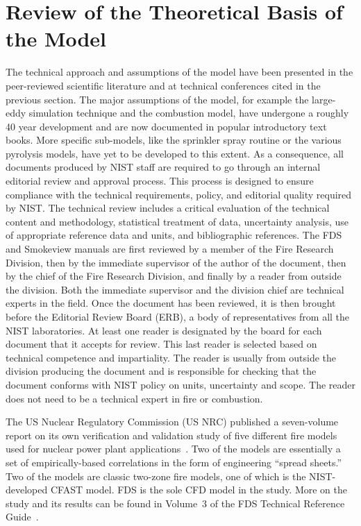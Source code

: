 \documentclass[11pt]{book}
\begin{document}
\section{Review of the Theoretical Basis of the Model}
\label{JustAA}

The technical approach and assumptions of the model have been presented in the peer-reviewed scientific literature and at technical conferences cited in the previous section. The major assumptions of the model, for example the large-eddy simulation technique and the combustion model, have undergone a roughly 40 year development and are now documented in popular introductory text books. More specific sub-models, like the sprinkler spray routine or the various pyrolysis models, have yet to be developed to this extent. As a consequence, all documents produced by NIST staff are required to go through an internal editorial review and approval process. This process is designed to ensure compliance with the technical requirements, policy, and editorial quality required by NIST. The technical review includes a critical evaluation of the technical content and methodology, statistical treatment of data, uncertainty analysis, use of appropriate reference data and units, and bibliographic references. The FDS and Smokeview manuals are first reviewed by a member of the Fire Research Division, then by the immediate supervisor of the author of the document, then by the chief of the Fire Research Division, and finally by a reader from outside the division. Both the immediate supervisor and the division
chief are technical experts in the field. Once the document has been reviewed, it is then brought before the Editorial Review Board (ERB), a body of representatives from all the NIST laboratories. At least one reader is designated by the board for each document that it accepts for review. This last reader is selected based on technical competence and impartiality. The reader is usually from outside the division producing the document and is responsible for checking that the document conforms with NIST policy on units, uncertainty and scope. The reader does not need to be a technical expert in fire or combustion.

The US Nuclear Regulatory Commission (US NRC) published a seven-volume report on its own verification and validation study of five different fire models used for nuclear power plant applications~\cite{NUREG_1824_Sup_1}. Two of the models are essentially a set of empirically-based correlations in the form of engineering ``spread sheets.'' Two of the models are classic two-zone fire models, one of which is the NIST-developed CFAST model. FDS is the sole CFD model in the study. More on the study and its results can be found in Volume~3 of the FDS Technical Reference Guide~\cite{FDS_Tech_Guide}.
\end{document}
